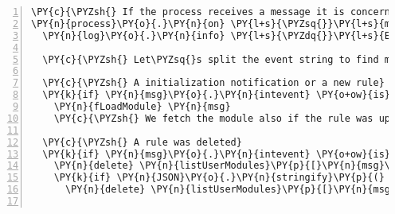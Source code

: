 \begin{Verbatim}[fontsize=\scriptsize,commandchars=\\\{\},numbers=left,firstnumber=1,stepnumber=1]
\PY{c}{\PYZsh{} If the process receives a message it is concerning the rules}
\PY{n}{process}\PY{o}{.}\PY{n}{on} \PY{l+s}{\PYZsq{}}\PY{l+s}{message}\PY{l+s}{\PYZsq{}}\PY{p}{,} \PY{p}{(} \PY{n}{msg} \PY{p}{)} \PY{o}{\PYZhy{}}\PY{o}{\PYZgt{}}
  \PY{n}{log}\PY{o}{.}\PY{n}{info} \PY{l+s}{\PYZdq{}}\PY{l+s}{EP | Got info about new rule: \PYZsh{}\PYZob{} msg.event \PYZcb{}}\PY{l+s}{\PYZdq{}}

  \PY{c}{\PYZsh{} Let\PYZsq{}s split the event string to find module and function in an array}

  \PY{c}{\PYZsh{} A initialization notification or a new rule}
  \PY{k}{if} \PY{n}{msg}\PY{o}{.}\PY{n}{intevent} \PY{o+ow}{is} \PY{l+s}{\PYZsq{}}\PY{l+s}{new}\PY{l+s}{\PYZsq{}} \PY{o+ow}{or} \PY{n}{msg}\PY{o}{.}\PY{n}{intevent} \PY{o+ow}{is} \PY{l+s}{\PYZsq{}}\PY{l+s}{init}\PY{l+s}{\PYZsq{}}
    \PY{n}{fLoadModule} \PY{n}{msg}
    \PY{c}{\PYZsh{} We fetch the module also if the rule was updated}

  \PY{c}{\PYZsh{} A rule was deleted}
  \PY{k}{if} \PY{n}{msg}\PY{o}{.}\PY{n}{intevent} \PY{o+ow}{is} \PY{l+s}{\PYZsq{}}\PY{l+s}{del}\PY{l+s}{\PYZsq{}}
    \PY{n}{delete} \PY{n}{listUserModules}\PY{p}{[}\PY{n}{msg}\PY{o}{.}\PY{n}{user}\PY{p}{]}\PY{p}{[}\PY{n}{msg}\PY{o}{.}\PY{n}{ruleId}\PY{p}{]}
    \PY{k}{if} \PY{n}{JSON}\PY{o}{.}\PY{n}{stringify}\PY{p}{(} \PY{n}{listUserModules}\PY{p}{[}\PY{n}{msg}\PY{o}{.}\PY{n}{user}\PY{p}{]} \PY{p}{)} \PY{o+ow}{is} \PY{l+s}{\PYZdq{}}\PY{l+s}{\PYZob{}\PYZcb{}}\PY{l+s}{\PYZdq{}}
      \PY{n}{delete} \PY{n}{listUserModules}\PY{p}{[}\PY{n}{msg}\PY{o}{.}\PY{n}{user}\PY{p}{]}


\end{Verbatim}
